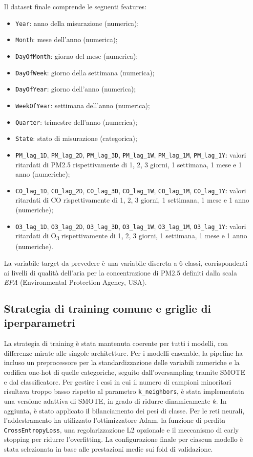 \documentclass[a4paper,12pt]{report}
\begin{document}
	Il dataset finale comprende le seguenti features:
	\begin{itemize}
		\item \texttt{Year}: anno della misurazione (numerica);
		\item \texttt{Month}: mese dell’anno (numerica);
		\item \texttt{DayOfMonth}: giorno del mese (numerica);
		\item \texttt{DayOfWeek}: giorno della settimana (numerica);
		\item \texttt{DayOfYear}: giorno dell’anno (numerica);
		\item \texttt{WeekOfYear}: settimana dell’anno (numerica);
		\item \texttt{Quarter}: trimestre dell’anno (numerica);
		\item \texttt{State}: stato di misurazione (categorica);
		\item \texttt{PM\_lag\_1D}, \texttt{PM\_lag\_2D}, \texttt{PM\_lag\_3D}, \texttt{PM\_lag\_1W}, \texttt{PM\_lag\_1M}, \texttt{PM\_lag\_1Y}: valori ritardati di PM2.5 rispettivamente di 1, 2, 3 giorni, 1 settimana, 1 mese e 1 anno (numeriche);
		\item \texttt{CO\_lag\_1D}, \texttt{CO\_lag\_2D}, \texttt{CO\_lag\_3D}, \texttt{CO\_lag\_1W}, \texttt{CO\_lag\_1M}, \texttt{CO\_lag\_1Y}: valori ritardati di CO rispettivamente di 1, 2, 3 giorni, 1 settimana, 1 mese e 1 anno (numeriche);
		\item \texttt{O3\_lag\_1D}, \texttt{O3\_lag\_2D}, \texttt{O3\_lag\_3D}, \texttt{O3\_lag\_1W}, \texttt{O3\_lag\_1M}, \texttt{O3\_lag\_1Y}: valori ritardati di O\textsubscript{3} rispettivamente di 1, 2, 3 giorni, 1 settimana, 1 mese e 1 anno (numeriche).
	\end{itemize}
	
	La variabile target da prevedere è una variabile discreta a 6 classi, corrispondenti ai livelli di qualità dell’aria per la concentrazione di PM2.5 definiti dalla scala \textit{EPA} (Environmental Protection Agency, USA).
	
	\subsection{Strategia di training comune e griglie di iperparametri}
	La strategia di training è stata mantenuta coerente per tutti i modelli, con differenze mirate alle singole architetture. Per i modelli ensemble, la pipeline ha incluso un preprocessore per la standardizzazione delle variabili numeriche e la codifica one-hot di quelle categoriche, seguito dall’oversampling tramite SMOTE e dal classificatore. Per gestire i casi in cui il numero di campioni minoritari risultava troppo basso rispetto al parametro \texttt{k\_neighbors}, è stata implementata una versione adattiva di SMOTE, in grado di ridurre dinamicamente $k$. In aggiunta, è stato applicato il bilanciamento dei pesi di classe. Per le reti neurali, l’addestramento ha utilizzato l’ottimizzatore Adam, la funzione di perdita \texttt{CrossEntropyLoss}, una regolarizzazione L2 opzionale e il meccanismo di early stopping per ridurre l’overfitting. La configurazione finale per ciascun modello è stata selezionata in base alle prestazioni medie sui fold di validazione. \\
	
\end{document}
